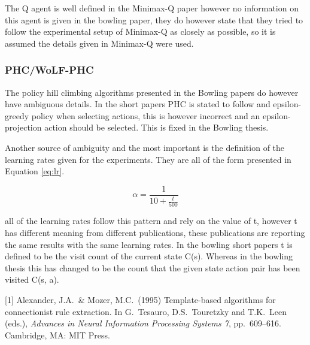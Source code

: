 \documentclass{article}
\begin{document}
The Q agent is well defined in the Minimax-Q paper however no information on this agent is given in the bowling paper, they do however state that they tried to follow the experimental setup of Minimax-Q as closely as possible, so it is assumed the details given in Minimax-Q were used.

\subsubsection*{PHC/WoLF-PHC}

The policy hill climbing algorithms presented in the Bowling papers do however have ambiguous details. In the short papers PHC is stated to follow and epsilon-greedy policy when selecting actions, this is however incorrect and an epsilon-projection action should be selected. This is fixed in the Bowling thesis.

Another source of ambiguity and the most important is the definition of the learning rates given for the experiments. They are all of the form presented in Equation \ref{eq:lr}. 

\begin{equation}
    \alpha = \frac{1}{10+\frac{t}{500}}\label{eq:lr}
\end{equation}

all of the learning rates follow this pattern and rely on the value of t, however t has different meaning from different publications, these publications are reporting the same results with the same learning rates. In the bowling short papers t is defined to be the visit count of the current state C(s). Whereas in the bowling thesis this has changed to be the count that the given state action pair has been visited C(s, a).



\medskip

\small

[1] Alexander, J.A.\ \& Mozer, M.C.\ (1995) Template-based algorithms for
connectionist rule extraction. In G.\ Tesauro, D.S.\ Touretzky and T.K.\ Leen
(eds.), {\it Advances in Neural Information Processing Systems 7},
pp.\ 609--616. Cambridge, MA: MIT Press.
\end{document}
